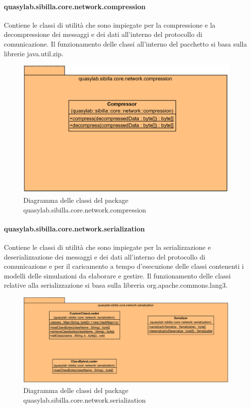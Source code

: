 \paragraph{quasylab.sibilla.core.network.compression} Contiene le classi di utilità che sono impiegate per la compressione e la decompressione dei messaggi e dei dati all’interno del protocollo di comunicazione. Il funzionamento delle classi all’interno del pacchetto si basa sulla librerie java.util.zip.

\begin{figure}[H]
    \includegraphics[width=\linewidth]{images/quasylab.sibilla.core.network.compression.png}
    \captionsetup{justification=centering}
    \caption{Diagramma delle classi del package quasylab.sibilla.core.network.compression}
  \end{figure}

\paragraph{quasylab.sibilla.core.network.serialization} Contiene le classi di utilità che sono impiegate per la serializzazione e deserializzazione dei messaggi e dei dati all’interno del protocollo di comunicazione e per il caricamento a tempo d’esecuzione delle classi contenenti i modelli delle simulazioni da elaborare e gestire. Il funzionamento delle classi relative alla serializzazione si basa sulla libreria org.apache.commons.lang3.

\begin{figure}[H]
    \includegraphics[width=\linewidth]{images/quasylab.sibilla.core.network.serialization.png}
    \captionsetup{justification=centering}
    \caption{Diagramma delle classi del package quasylab.sibilla.core.network.serialization}
  \end{figure}

